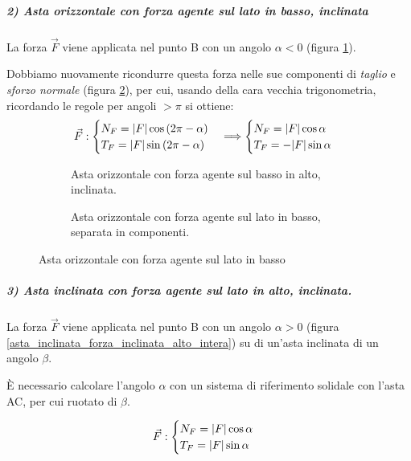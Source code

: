 \documentclass[main.tex]{subfiles}
\begin{document}
\subparagraph{2) Asta orizzontale con forza agente sul lato in basso, inclinata}
La forza $\vec{F}$ viene applicata nel punto B con un angolo $\alpha<0$ (figura \ref{asta_orizzontale_forza_inclinata_basso_intera}).

Dobbiamo nuovamente ricondurre questa forza nelle sue componenti di \textit{taglio} e \textit{sforzo normale} (figura \ref{asta_orizzontale_forza_inclinata_basso_separata}), per cui, usando della cara vecchia trigonometria, ricordando le regole per angoli $>\pi$ si ottiene:
\[
	\vec{F}: \begin{cases}
		N_F = \lvert F\rvert\cos{(2\pi - \alpha)}\\
		T_F = \lvert F\rvert\sin{(2\pi-\alpha)}
	\end{cases}
	\Longrightarrow
	\begin{cases}
		N_F = \lvert F\rvert\cos{\alpha}\\
		T_F = -\lvert F\rvert\sin{\alpha}
	\end{cases}
\]

\begin{figure}[!tbp]
  \begin{subfigure}[b]{.5\textwidth}
  \centering
  \resizebox{.5\textwidth}{!}{}
  \caption{Asta orizzontale con forza agente sul basso in alto, inclinata.}
  \label{asta_orizzontale_forza_inclinata_basso_intera}
  \end{subfigure}
  \hfill
  \begin{subfigure}[b]{.5\textwidth}
  \centering
  \resizebox{.5\textwidth}{!}{}
  \caption{Asta orizzontale con forza agente sul lato in basso, separata in componenti.}
  \label{asta_orizzontale_forza_inclinata_basso_separata}
  \end{subfigure}
  \caption{Asta orizzontale con forza agente sul lato in basso}
  \label{asta_orizzontale_forza_inclinata_basso}
\end{figure}

\subparagraph{3) Asta inclinata con forza agente sul lato in alto, inclinata.}
La forza $\vec{F}$ viene applicata nel punto B con un angolo $\alpha>0$ (figura \ref{asta_inclinata_forza_inclinata_alto_intera}) su di un'asta inclinata di un angolo $\beta$.

È necessario calcolare l'angolo $\alpha$ con un sistema di riferimento solidale con l'asta AC, per cui ruotato di $\beta$.

\[
	\vec{F}: \begin{cases}
		N_F = \lvert F\rvert\cos{\alpha}\\
		T_F = \lvert F\rvert\sin{\alpha}
	\end{cases}
\]
\end{document}
